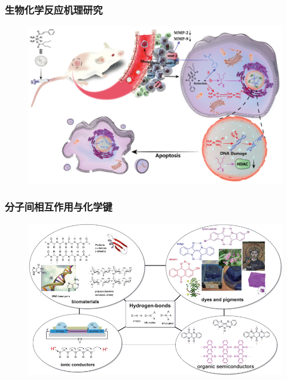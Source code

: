 \frame
{
	\frametitle{生物化学反应机理研究}
\begin{figure}[h!]
\centering
\vspace{-8.5pt}
\includegraphics[height=0.67\textwidth,width=1.0\textwidth,viewport=0 0 1380 900,clip]{Figures/anti-tumour_mechanism-of the-Cin-Pt(IV)-Val-complex.png}
\label{mechanism}
\end{figure}
}

\frame
{
	\frametitle{分子间相互作用与化学键}
\begin{figure}[h!]
\centering
\vspace{-25.5pt}
\includegraphics[height=0.67\textwidth,width=1.0\textwidth,viewport=0 0 830 500,clip]{Figures/Bio-H-bond-1.png}
\label{Bio-H-bond}
\end{figure}
}

